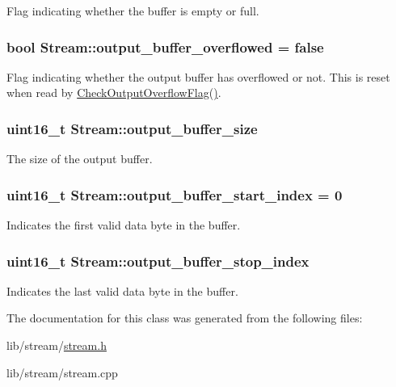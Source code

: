 Flag indicating whether the buffer is empty or full. \hypertarget{class_stream_a149776fead5c56894699da5bfe489b65}{
\subsubsection[{output\-\_\-buffer\-\_\-overflowed}]{\setlength{\rightskip}{0pt plus 5cm}bool Stream\-::output\-\_\-buffer\-\_\-overflowed = false\hspace{0.3cm}{\ttfamily [protected]}}}\label{class_stream_a149776fead5c56894699da5bfe489b65}
Flag indicating whether the output buffer has overflowed or not. This is reset when read by \hyperlink{class_stream_aee6c201819b874c5934a270592d9d311}{Check\-Output\-Overflow\-Flag()}. \hypertarget{class_stream_a0e9fd6570bafb97ab76ebd37158e78ff}{
\subsubsection[{output\-\_\-buffer\-\_\-size}]{\setlength{\rightskip}{0pt plus 5cm}uint16\-\_\-t Stream\-::output\-\_\-buffer\-\_\-size\hspace{0.3cm}{\ttfamily [protected]}}}\label{class_stream_a0e9fd6570bafb97ab76ebd37158e78ff}
The size of the output buffer. \hypertarget{class_stream_a1b2d63accede402e5c4c7fd3747d4c33}{
\subsubsection[{output\-\_\-buffer\-\_\-start\-\_\-index}]{\setlength{\rightskip}{0pt plus 5cm}uint16\-\_\-t Stream\-::output\-\_\-buffer\-\_\-start\-\_\-index = 0\hspace{0.3cm}{\ttfamily [protected]}}}\label{class_stream_a1b2d63accede402e5c4c7fd3747d4c33}
Indicates the first valid data byte in the buffer. \hypertarget{class_stream_a39d177eedd4d5ff28a95cca9131daf4c}{
\subsubsection[{output\-\_\-buffer\-\_\-stop\-\_\-index}]{\setlength{\rightskip}{0pt plus 5cm}uint16\-\_\-t Stream\-::output\-\_\-buffer\-\_\-stop\-\_\-index\hspace{0.3cm}{\ttfamily [protected]}}}\label{class_stream_a39d177eedd4d5ff28a95cca9131daf4c}
Indicates the last valid data byte in the buffer. 

The documentation for this class was generated from the following files\-:\begin{DoxyCompactItemize}
\item 
lib/stream/\hyperlink{stream_8h}{stream.\-h}\item 
lib/stream/stream.\-cpp\end{DoxyCompactItemize}
